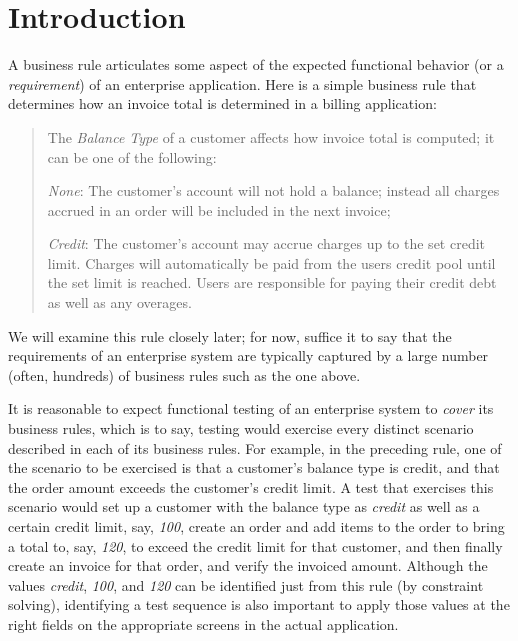 \section{Introduction}

A business rule articulates some aspect of the expected functional behavior (or
a \textit{requirement}) of an enterprise application. Here is a simple business
rule that determines how an invoice total is determined in a billing
application:
%
\begin{quote}
	The \textit{Balance Type} of a customer affects how invoice total is computed; it can be 
	one of the following:

	\textit{None}: The customer's account will not hold a balance; instead all charges accrued 
	in an order will be included in the next invoice;
	
	\textit{Credit}: The customer's account may accrue charges up to the set credit limit. 
	Charges will automatically be paid from the users credit pool until the set limit is reached. 
	Users are responsible for paying their credit debt as well as any overages.
\end{quote}	
%
We will examine this rule closely later; for now, suffice it to say that the
requirements of an enterprise system are typically captured by a large number
(often, hundreds) of business rules such as the one above.

It is reasonable to expect functional testing of an enterprise system to
\textit{cover} its business rules, which is to say, testing would exercise every
distinct scenario described in each of its business rules.  For example, in the
preceding rule, one of the scenario to be exercised is that a customer's balance
type is credit, and that the order amount exceeds the customer's credit limit.
A test that exercises this scenario would set up a customer with the balance
type as \textit{credit} as well as a certain credit limit, say, \textit{100},
create an order and add items to the order to bring a total to, say,
\textit{120}, to exceed the credit limit for that customer, and then finally
create an invoice for that order, and verify the invoiced amount.
Although the values
\textit{credit}, \textit{100}, and \textit{120} can be identified just from this
rule (by constraint solving), identifying a test sequence is also important to
apply those values at the right fields on the appropriate
screens in the actual application.

